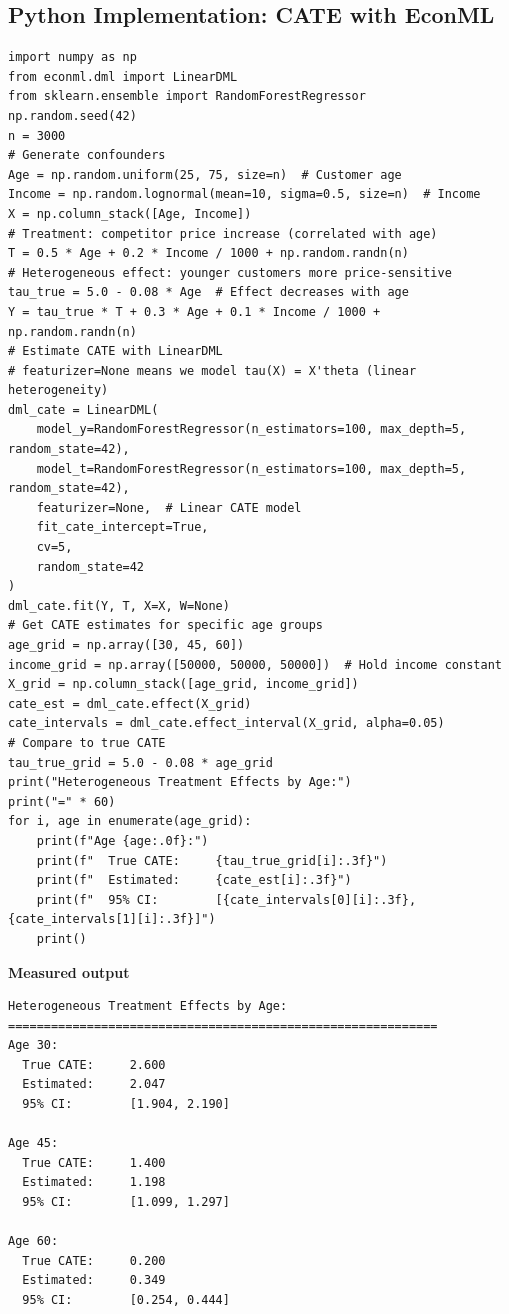 \subsection{Python Implementation: CATE with
EconML}\label{_python_implementation_cate_with_econml}

\begin{verbatim}
import numpy as np
from econml.dml import LinearDML
from sklearn.ensemble import RandomForestRegressor
np.random.seed(42)
n = 3000
# Generate confounders
Age = np.random.uniform(25, 75, size=n)  # Customer age
Income = np.random.lognormal(mean=10, sigma=0.5, size=n)  # Income
X = np.column_stack([Age, Income])
# Treatment: competitor price increase (correlated with age)
T = 0.5 * Age + 0.2 * Income / 1000 + np.random.randn(n)
# Heterogeneous effect: younger customers more price-sensitive
tau_true = 5.0 - 0.08 * Age  # Effect decreases with age
Y = tau_true * T + 0.3 * Age + 0.1 * Income / 1000 + np.random.randn(n)
# Estimate CATE with LinearDML
# featurizer=None means we model tau(X) = X'theta (linear heterogeneity)
dml_cate = LinearDML(
    model_y=RandomForestRegressor(n_estimators=100, max_depth=5, random_state=42),
    model_t=RandomForestRegressor(n_estimators=100, max_depth=5, random_state=42),
    featurizer=None,  # Linear CATE model
    fit_cate_intercept=True,
    cv=5,
    random_state=42
)
dml_cate.fit(Y, T, X=X, W=None)
# Get CATE estimates for specific age groups
age_grid = np.array([30, 45, 60])
income_grid = np.array([50000, 50000, 50000])  # Hold income constant
X_grid = np.column_stack([age_grid, income_grid])
cate_est = dml_cate.effect(X_grid)
cate_intervals = dml_cate.effect_interval(X_grid, alpha=0.05)
# Compare to true CATE
tau_true_grid = 5.0 - 0.08 * age_grid
print("Heterogeneous Treatment Effects by Age:")
print("=" * 60)
for i, age in enumerate(age_grid):
    print(f"Age {age:.0f}:")
    print(f"  True CATE:     {tau_true_grid[i]:.3f}")
    print(f"  Estimated:     {cate_est[i]:.3f}")
    print(f"  95% CI:        [{cate_intervals[0][i]:.3f}, {cate_intervals[1][i]:.3f}]")
    print()
\end{verbatim}

\textbf{Measured output}

\begin{verbatim}
Heterogeneous Treatment Effects by Age:
============================================================
Age 30:
  True CATE:     2.600
  Estimated:     2.047
  95% CI:        [1.904, 2.190]

Age 45:
  True CATE:     1.400
  Estimated:     1.198
  95% CI:        [1.099, 1.297]

Age 60:
  True CATE:     0.200
  Estimated:     0.349
  95% CI:        [0.254, 0.444]
\end{verbatim}


